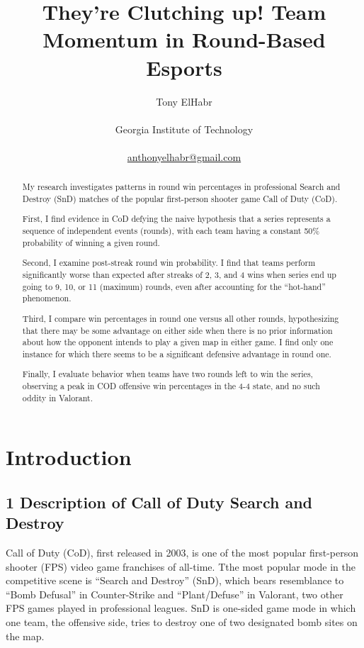 \documentclass[
]{article}
\title{They're Clutching up! Team Momentum in Round-Based Esports}
\author{
Tony ElHabr\\\\Georgia Institute of
Technology\\\\\href{mailto:anthonyelhabr@gmail.com}{anthonyelhabr@gmail.com}}
\date{}
\begin{document}
\maketitle
\begin{abstract}
My research investigates patterns in round win percentages in
professional Search and Destroy (SnD) matches of the popular
first-person shooter game Call of Duty (CoD).

First, I find evidence in CoD defying the naive hypothesis that a series
represents a sequence of independent events (rounds), with each team
having a constant 50\% probability of winning a given round.

Second, I examine post-streak round win probability. I find that teams
perform significantly worse than expected after streaks of 2, 3, and 4
wins when series end up going to 9, 10, or 11 (maximum) rounds, even
after accounting for the ``hot-hand'' phenomenon.

Third, I compare win percentages in round one versus all other rounds,
hypothesizing that there may be some advantage on either side when there
is no prior information about how the opponent intends to play a given
map in either game. I find only one instance for which there seems to be
a significant defensive advantage in round one.

Finally, I evaluate behavior when teams have two rounds left to win the
series, observing a peak in COD offensive win percentages in the 4-4
state, and no such oddity in Valorant.
\end{abstract}
\ifdefined\Shaded\renewenvironment{Shaded}{\begin{tcolorbox}[interior hidden, boxrule=0pt, enhanced, borderline west={3pt}{0pt}{shadecolor}, frame hidden, sharp corners, breakable]}{\end{tcolorbox}}\fi

\hypertarget{introduction}{%
\section{Introduction}\label{introduction}}

\hypertarget{description-of-call-of-duty-search-and-destroy}{%
\subsection{1 Description of Call of Duty Search and
Destroy}\label{description-of-call-of-duty-search-and-destroy}}

Call of Duty (CoD), first released in 2003, is one of the most popular
first-person shooter (FPS) video game franchises of all-time. Tthe most
popular mode in the competitive scene is ``Search and Destroy'' (SnD),
which bears resemblance to ``Bomb Defusal'' in Counter-Strike and
``Plant/Defuse'' in Valorant, two other FPS games played in professional
leagues. SnD is one-sided game mode in which one team, the offensive
side, tries to destroy one of two designated bomb sites on the map.
\end{document}
